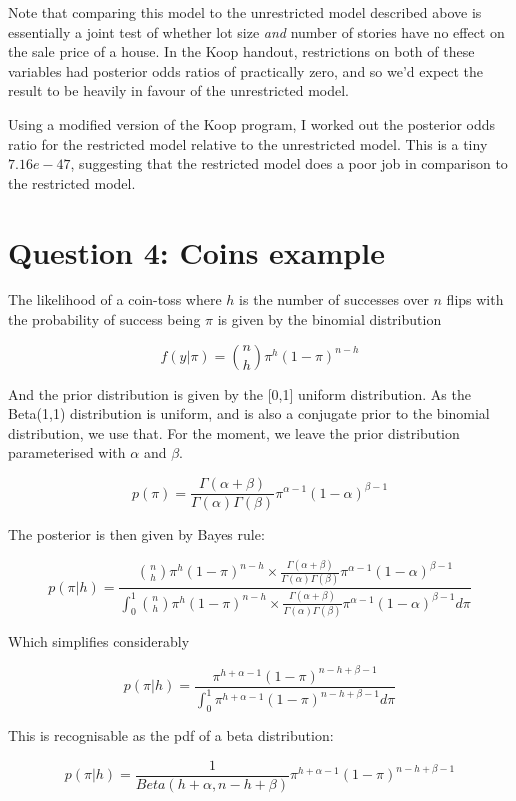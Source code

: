 \documentclass[a4paper,11pt]{article}
\begin{document}
\bigskip

Note that comparing this model to the unrestricted model described above is essentially a joint test of whether lot size \emph{and} number of stories have no effect on the sale price of a house. In the Koop handout, restrictions on both of these variables had posterior odds ratios of practically zero, and so we'd expect the result to be heavily in favour of the unrestricted model.

Using a modified version of the Koop program, I worked out the posterior odds ratio for the restricted model relative to the unrestricted model. This is a tiny $7.16e-47$, suggesting that the restricted model does a poor job in comparison to the restricted model.

\section*{Question 4: Coins example}

The likelihood of a coin-toss where $h$ is the number of successes over $n$ flips with the probability of success being $\pi$ is given by the binomial distribution

\[
f(y|\pi) = {n \choose h} \pi^{h} (1-\pi)^{n-h}
\]

And the prior distribution is given by the [0,1] uniform distribution. As the Beta(1,1) distribution is uniform, and is also a conjugate prior to the binomial distribution, we use that. For the moment, we leave the prior distribution parameterised with $\alpha$ and $\beta$.

\[
p(\pi) = \frac{\Gamma(\alpha + \beta)}{\Gamma(\alpha)\Gamma(\beta)} \pi^{\alpha-1} (1-\alpha)^{\beta-1}
\]

The posterior is then given by Bayes rule:

\[
p(\pi|h) = \frac{{n \choose h} \pi^{h} (1-\pi)^{n-h}\times \frac{\Gamma(\alpha + \beta)}{\Gamma(\alpha)\Gamma(\beta)} \pi^{\alpha-1} (1-\alpha)^{\beta-1}}{\int_{0}^{1}{n \choose h} \pi^{h} (1-\pi)^{n-h}\times \frac{\Gamma(\alpha + \beta)}{\Gamma(\alpha)\Gamma(\beta)} \pi^{\alpha-1} (1-\alpha)^{\beta-1} d\pi}
\]

Which simplifies considerably

\[
p(\pi|h) = \frac{ \pi^{h + \alpha - 1} (1-\pi)^{n-h + \beta - 1}}{\int_{0}^{1}\pi^{h + \alpha - 1} (1-\pi)^{n-h + \beta - 1} d \pi}
\]

This is recognisable as the pdf of a beta distribution:

\[
p(\pi|h) = \frac{1}{Beta(h + \alpha, n - h + \beta)} \pi^{h + \alpha-1} (1-\pi)^{n-h + \beta-1}
\]
\end{document}
